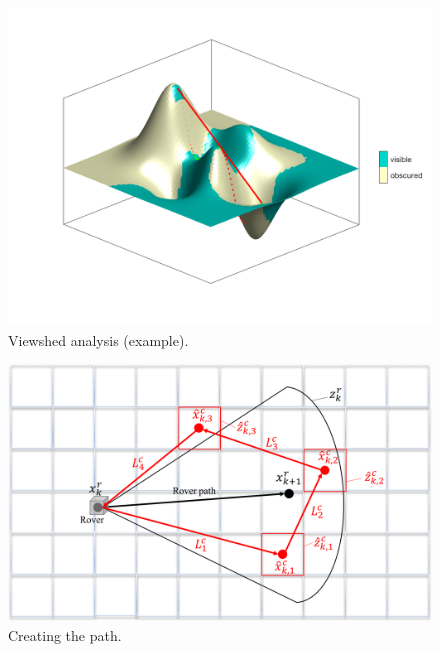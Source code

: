 \documentclass[conference]{IEEEtran}
\begin{document}
\begin{figure}[h]
		\centering
		\includegraphics[width=1.0\columnwidth]{figs/vs.png}
		\caption{Viewshed analysis (example).}
		\label{fig:vs}
\end{figure}
\begin{figure}[h]
		\centering
		\includegraphics[width=1.0\columnwidth]{figs/8_4.png}
		\caption{Creating the path.}
		\label{fig:8_4}
\end{figure}
\end{document}
